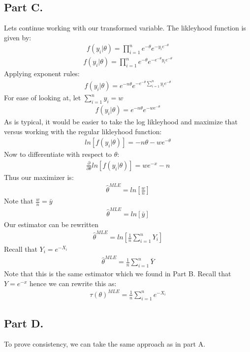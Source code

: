 \documentclass{article}
\begin{document}
\subsection*{Part C.}
Lets continue working with our transformed variable. The likleyhood function is given by:
\begin{align*}
f(y_i|\theta) = \prod_{i=1}^{n} e^{-\theta} e^{-y_i e^{-\theta}}
\end{align*}
\begin{align*}
f(y_i|\theta) = \prod_{i=1}^{n} e^{-\theta} e^{ - e^{-\theta} y_i e^{-\theta}}
\end{align*}
Applying exponent rules:
\begin{align*}
f(y_i|\theta) = e^{-n \theta} e^{ - e^{-\theta} \sum_{i=1}^{n} y_i e^{-\theta}}
\end{align*}
For ease of looking at, let $\sum_{i=1}^{n} y_i = w$
\begin{align*}
f(y_i|\theta) = e^{-n\theta} e^{ - w e^{-\theta}}
\end{align*}
As is typical, it would be easier to take the log likleyhood and maximize that versus working with the regular likleyhood function:
\begin{align*}
ln[ f(y_i|\theta)] = -n\theta - w e^{-\theta}
\end{align*}
Now to differentiate with respect to $\theta$:
\begin{align*}
\frac{\partial}{\partial \theta } ln[ f(y_i|\theta)] = w e^{-x} - n
\end{align*}
Thus our maximizer is:
\begin{align*}
\hat{\theta}^{MLE} = ln[\frac{w}{n}]
\end{align*}
Note that $\frac{w}{n}=\bar{y}$
\begin{align*}
\hat{\theta}^{MLE} = ln[\bar{y}]
\end{align*}
Our estimator can be rewritten
\begin{align*}
\hat{\theta}^{MLE} = ln[\frac{1}{n} \sum_{i=1}^{n} Y_i]
\end{align*}
Recall that $Y_i = e^{-X_i}$
\begin{align*}
\hat{\theta}^{MLE} = \frac{1}{n} \sum_{i=1}^{n} \bar{Y}
\end{align*}
Note that this is the same estimator which we found in Part B. Recall that $Y=e^{-x}$ hence we can rewrite this as:
\begin{align*}
\tau(\theta)^{MLE} = \frac{1}{n} \sum_{i=1}^{n} e^{-X_i}
\end{align*}
\subsection*{Part D.}
To prove consistency, we can take the same approach as in part A.
\end{document}
